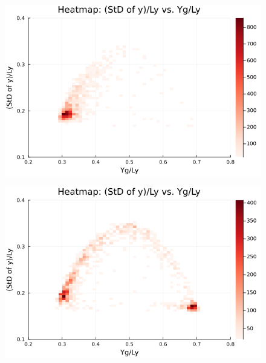 \begin{figure}[H]
  \centering
  \includegraphics[scale=0.6]{image/RaRtmap10_heat/2023-12-28T12:38:52.386_map_10times_chi1.265_Ay50_rho0.4_T0.43_dT0.04_Rd0.0_Rt0.375_Ra0.4693845_g0.0003999718779659611_run4.0e8.png}
  \label{}
\end{figure}

\begin{figure}[H]
  \centering
  \includegraphics[scale=0.6]{image/RaRtmap10_heat/2023-12-28T12:38:52.469_map_10times_chi1.265_Ay50_rho0.4_T0.43_dT0.04_Rd0.0_Rt0.375_Ra0.938769_g0.0003999718779659611_run4.0e8.png}
  \label{}
\end{figure}

